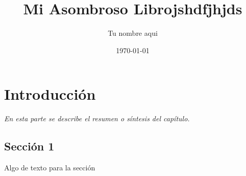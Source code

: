 \documentclass[]{book}
\title{\bf Mi Asombroso Librojshdfjhjds}
\author{Tu nombre aqui}
\date{\today}
\begin{document}
\frontmatter
\maketitle
\tableofcontents
\mainmatter
\chapter{Introducción}
\begin{center}
\textit{En esta parte se describe el resumen o síntesis
del capítulo.}
\end{center}
\section{Sección 1}
Algo de texto para la sección
\end{document}

